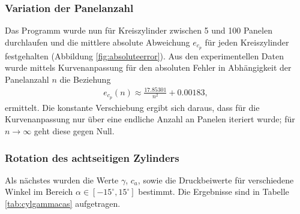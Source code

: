 \subsubsection{Variation der Panelanzahl}
Das Programm wurde nun für Kreiszylinder zwischen 5 und 100 Panelen durchlaufen und die mittlere absolute Abweichung $e_{c_p}$ für jeden Kreiszylinder festgehalten (Abbildung \ref{fig:absoluteerror}). Aus den experimentellen Daten wurde mittels Kurvenanpassung für den absoluten Fehler in Abhängigkeit der Panelanzahl $n$ die Beziehung 
\begin{align*}
e_{c_{p}}(n) \approx \frac{17.85301}{n^2} + 0.00183,
\end{align*}
ermittelt. Die konstante Verschiebung ergibt sich daraus, dass für die Kurvenanpassung nur über eine endliche Anzahl an Panelen iteriert wurde; für $n \to \infty$ geht diese gegen Null.

\subsubsection{Rotation des achtseitigen Zylinders}
Als nächstes wurden die Werte $\gamma$, $c_a$, sowie die Druckbeiwerte für verschiedene Winkel im Bereich $\alpha \in [-15^{\circ}, 15^{\circ}]$ bestimmt. Die Ergebnisse sind in Tabelle \ref{tab:cylgammacas} aufgetragen. 

